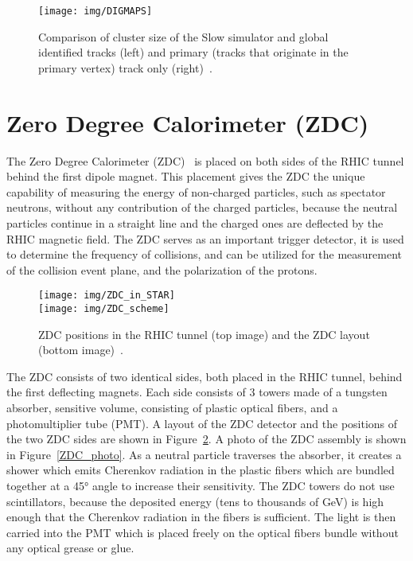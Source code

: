 \begin{figure}[!htb]
\begin{center}
 \texttt{[image: img/DIGMAPS]}\\
\end{center}
\caption{\label{AuAuDigmaps}Comparison of cluster size of the Slow simulator and global identified tracks (left) and primary (tracks that originate in the primary vertex) track only
(right)~\cite{KubaVyzkumak}.}
\end{figure}

\section{Zero Degree Calorimeter (ZDC)\label{ZDCsection}} 


The Zero Degree Calorimeter (ZDC)~\cite{ZDC, ZDCSMD} is placed on both sides of the RHIC tunnel behind the first dipole magnet. This placement gives the ZDC the unique capability of measuring the energy of non-charged particles, such as spectator neutrons, without any contribution of the charged particles, because the neutral particles continue in a straight line and the charged ones are deflected by the RHIC magnetic field. The ZDC serves as an important trigger detector, it is used
to determine the frequency of collisions, and can be utilized for the measurement of the collision event plane, and the polarization of the protons.

\begin{figure}[!htb]
\begin{center}
  \texttt{[image: img/ZDC\_in\_STAR]}\\
  \texttt{[image: img/ZDC\_scheme]}
\end{center}
\caption{\label{ZDC_scheme}ZDC positions in the RHIC tunnel (top image) and the ZDC layout (bottom image)~\cite{ZDCSMD}. }
\end{figure}


The ZDC consists of two identical sides, both placed in the RHIC tunnel, behind 
the first deflecting magnets. Each side consists of 3 towers made of a tungsten absorber, sensitive volume, consisting of plastic optical fibers, and a photomultiplier tube (PMT)\@. A layout of the ZDC detector and the positions of the two ZDC sides are shown in Figure~\ref{ZDC_scheme}\@. A photo of the ZDC assembly is shown in Figure~\ref{ZDC_photo}\@. As a neutral particle traverses the absorber, it creates a shower which emits Cherenkov radiation in the plastic fibers which are bundled together at a 45° angle to increase their sensitivity. The ZDC towers do not use scintillators, because the deposited energy (tens to thousands of GeV) is high enough that the Cherenkov radiation in the fibers is sufficient. The light is then carried into the PMT which is placed freely on the optical fibers bundle without any optical grease or glue.

